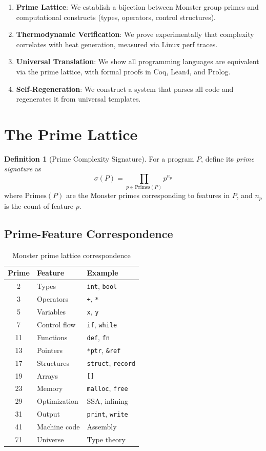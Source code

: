 \documentclass[12pt]{amsart}
\theoremstyle{plain}
\theoremstyle{definition}
\newtheorem{definition}[theorem]{Definition}
\theoremstyle{remark}
\begin{document}
\begin{enumerate}
\item \textbf{Prime Lattice}: We establish a bijection between Monster group primes and computational constructs (types, operators, control structures).

\item \textbf{Thermodynamic Verification}: We prove experimentally that complexity correlates with heat generation, measured via Linux perf traces.

\item \textbf{Universal Translation}: We show all programming languages are equivalent via the prime lattice, with formal proofs in Coq, Lean4, and Prolog.

\item \textbf{Self-Regeneration}: We construct a system that parses all code and regenerates it from universal templates.
\end{enumerate}

\section{The Prime Lattice}

\begin{definition}[Prime Complexity Signature]
For a program $P$, define its \emph{prime signature} as
\[
\sigma(P) = \prod_{p \in \text{Primes}(P)} p^{n_p}
\]
where $\text{Primes}(P)$ are the Monster primes corresponding to features in $P$, and $n_p$ is the count of feature $p$.
\end{definition}

\subsection{Prime-Feature Correspondence}

\begin{table}[h]
\centering
\begin{tabular}{|c|l|l|}
\hline
Prime & Feature & Example \\
\hline
2 & Types & \texttt{int}, \texttt{bool} \\
3 & Operators & \texttt{+}, \texttt{*} \\
5 & Variables & \texttt{x}, \texttt{y} \\
7 & Control flow & \texttt{if}, \texttt{while} \\
11 & Functions & \texttt{def}, \texttt{fn} \\
13 & Pointers & \texttt{*ptr}, \texttt{\&ref} \\
17 & Structures & \texttt{struct}, \texttt{record} \\
19 & Arrays & \texttt{[]} \\
23 & Memory & \texttt{malloc}, \texttt{free} \\
29 & Optimization & SSA, inlining \\
31 & Output & \texttt{print}, \texttt{write} \\
41 & Machine code & Assembly \\
71 & Universe & Type theory \\
\hline
\end{tabular}
\caption{Monster prime lattice correspondence}
\end{table}
\end{document}
